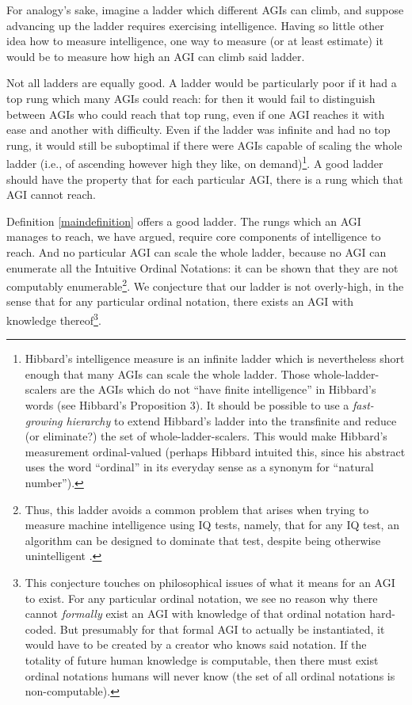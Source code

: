 \documentclass[runningheads]{llncs}
\begin{document}
For analogy's sake, imagine a ladder which different AGIs
can climb, and suppose advancing up the ladder requires exercising
intelligence. Having so little other idea how to measure
intelligence, one way to measure (or at least estimate) it would be
to measure how high an AGI can climb said ladder.

Not all ladders are equally good. A ladder would be particularly poor if it had
a top rung which many AGIs could reach: for then it would fail to
distinguish between AGIs who could reach that top rung, even if one
AGI reaches it with ease and another with difficulty.
Even if the ladder was infinite and had no top rung, it would still be suboptimal
if there were AGIs capable of scaling the whole
ladder (i.e., of ascending however high they like, on demand)\footnote{Hibbard's
intelligence measure
\cite{hibbard2011measuring} is an infinite ladder
which is nevertheless short enough that many AGIs can
scale the whole ladder. Those whole-ladder-scalers are the AGIs which
do not ``have finite intelligence'' in Hibbard's words
(see Hibbard's Proposition 3). It should be possible to
use a \emph{fast-growing hierarchy}
\cite{fairtlough1998hierarchies} \cite{weiermann2002slow}
to extend Hibbard's ladder into the transfinite and reduce (or eliminate?)
the set of whole-ladder-scalers. This would make
Hibbard's measurement ordinal-valued
(perhaps Hibbard intuited this, since his abstract uses the
word ``ordinal''
in its everyday sense as a synonym for ``natural number'').}.
A good ladder
should have the property that for each particular AGI, there is a rung which
that AGI cannot reach.

Definition \ref{maindefinition} offers a good ladder.
The rungs which an AGI
manages to reach, we have argued, require core components of intelligence
to reach.
And no particular AGI can scale
the whole ladder,
because no AGI can enumerate all the Intuitive Ordinal Notations: it can
be shown
that they are not computably enumerable\footnote{Thus,
this ladder avoids a common problem that arises when
trying to measure machine intelligence using IQ tests, namely, that for any IQ test,
an algorithm can be designed to dominate that
test, despite being otherwise unintelligent \cite{besold2015can}.}.
We conjecture that our ladder is not overly-high, in the sense that for any
particular ordinal notation, there exists an AGI with knowledge
thereof\footnote{This conjecture touches on philosophical issues of what it
means for an AGI to exist. For any particular ordinal notation, we see no reason
why there cannot \emph{formally} exist an AGI with knowledge of that ordinal notation
hard-coded. But presumably for that formal AGI to actually be instantiated,
it would have to be created by a creator who knows said notation. If the totality
of future human knowledge is computable,
then there must exist ordinal notations humans will never know
(the set of all ordinal notations is non-computable).}.
\end{document}
